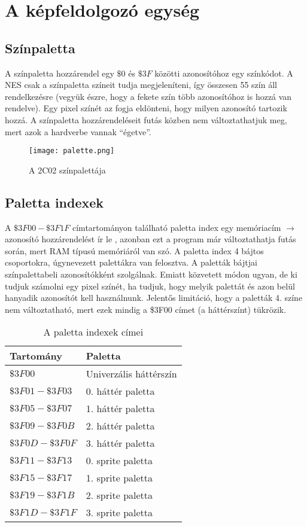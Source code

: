 \section{A képfeldolgozó egység}

\subsection{Színpaletta}

A színpaletta \cite{ppuref} hozzárendel egy $\$0$ és $\$3F$ közötti azonosítóhoz egy színkódot. A NES csak a színpaletta színeit tudja megjeleníteni, így összesen 55 szín áll rendelkezésre (vegyük észre, hogy a fekete szín több azonosítóhoz is hozzá van rendelve). Egy pixel színét az fogja eldönteni, hogy milyen azonosító tartozik hozzá. A színpaletta hozzárendeléseit futás közben nem változtathatjuk meg, mert azok a hardverbe vannak ``égetve''.

\vspace{0.3cm}
\begin{figure}[H]
	\centering
	\texttt{[image: palette.png]}
	\caption{A 2C02 színpalettája}
\end{figure}

\subsection{Paletta indexek}

A $\$3F00 - \$3F1F$ címtartományon található paletta index egy memóriacím $\rightarrow$ azonosító hozzárendelést ír le \cite{ppuref}, azonban ezt a program már változtathatja futás során, mert RAM típusú memóriáról van szó. A paletta index 4 bájtos csoportokra, úgynevezett palettákra van felosztva. A paletták bájtjai színpalettabeli azonosítókként szolgálnak. Emiatt közvetett módon ugyan, de ki tudjuk számolni egy pixel színét, ha tudjuk, hogy melyik palettát és azon belül hanyadik azonosítót kell használnunk. Jelentős limitáció, hogy a paletták 4. színe nem változtatható, mert ezek mindig a \$3F00 címet (a háttérszínt) tükrözik.

\begin{table}[H]
	\centering
	\begin{tabular}{ | l | l | }
		\hline
		Tartomány & Paletta \\
		\hline			
		$ \$3F00 $ & Univerzális háttérszín \\
		$ \$3F01 - \$3F03 $ & 0. háttér paletta \\
		$ \$3F05 - \$3F07 $ & 1. háttér paletta \\
		$ \$3F09 - \$3F0B $ & 2. háttér paletta \\
		$ \$3F0D - \$3F0F $ & 3. háttér paletta \\
		$ \$3F11 - \$3F13 $ & 0. sprite paletta \\
		$ \$3F15 - \$3F17 $ & 1. sprite paletta \\
		$ \$3F19 - \$3F1B $ & 2. sprite paletta \\
		$ \$3F1D - \$3F1F $ & 3. sprite paletta \\
		\hline
	\end{tabular}
	\caption{A paletta indexek címei}
	\label{fig:paletteram}
\end{table}


